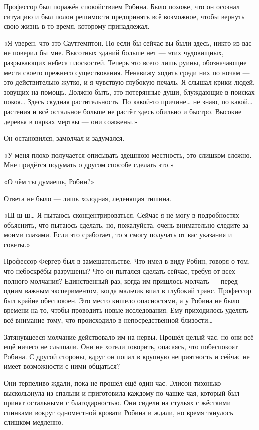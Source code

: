 \documentclass[a5paper, 9pt,
final, openany, twoside=true]{memoir}
\begin{document}
Профессор был поражён спокойствием Робина. Было похоже, что он осознал ситуацию и был полон решимости предпринять всё возможное, чтобы вернуть свою жизнь в то время, которому принадлежал.

«Я уверен, что это Саутгемптон. Но если бы сейчас вы были здесь, никто из вас не поверил бы мне. Высотных зданий больше нет — этих чудовищных, разрывающих небеса плоскостей. Теперь это всего лишь руины, обозначающие места своего прежнего существования. Ненавижу ходить среди них по ночам — это действительно жутко, и я чувствую глубокую печаль. Я слышал крики людей, зовущих на помощь. Должно быть, это потерянные души, блуждающие в поисках покоя… Здесь скудная растительность. По какой-то причине…  не знаю, по какой… растения и всё остальное больше не растёт здесь обильно и быстро. Высокие деревья в парках мертвы — они сожжены.»

Он остановился, замолчал и задумался.

«У меня плохо получается описывать здешнюю местность, это слишком сложно. Мне придётся подумать о другом способе сделать это.»

«О чём ты думаешь, Робин?»

Ответа не было — лишь холодная, леденящая тишина.

«Ш-ш-ш… Я пытаюсь сконцентрироваться. Сейчас я не могу в подробностях объяснить, что пытаюсь сделать, но, пожалуйста, очень внимательно следите за моими глазами. Если это сработает, то я смогу получать от вас указания и советы.»

Профессор Фергер был в замешательстве. Что имел в виду Робин, говоря о том, что небоскрёбы разрушены? Что он пытался сделать сейчас, требуя от всех полного молчания?  Единственный раз, когда им пришлось молчать — перед одним важным экспериментом, когда мальчик впал в глубокий транс. Профессор был крайне обеспокоен. Это место кишело опасностями, а у Робина не было времени на то, чтобы проводить новые исследования. Ему приходилось уделять всё внимание тому, что происходило в непосредственной близости…\bigskip

Затянувшееся молчание действовало им на нервы. Прошёл целый час, но они всё ещё ничего не слышали. Они не хотели говорить, опасаясь, что побеспокоят Робина. С другой стороны, вдруг он попал в крупную неприятность и сейчас не имеет возможности с ними общаться?

Они терпеливо ждали, пока не прошёл ещё один час. Элисон тихонько выскользнула из спальни и приготовила каждому по чашке чая, который был принят остальными с благодарностью. Они сидели на стульях с жёсткими спинками вокруг одноместной кровати Робина и ждали, но время тянулось слишком медленно.
\end{document}
